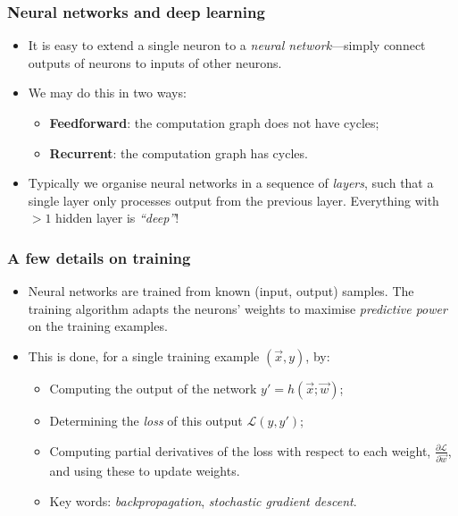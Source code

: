 \documentclass{beamer}
\begin{document}
\begin{frame}
	\frametitle{Neural networks and deep learning}
	\begin{itemize}
		\item It is easy to extend a single neuron to a \emph{neural network}---simply connect outputs of neurons to inputs of other neurons. 
		\vfill
		\item We may do this in two ways:
		\begin{itemize}
			\item \textbf{Feedforward}: the computation graph does not have cycles;
			\item \textbf{Recurrent}: the computation graph has cycles.
		\end{itemize}
		\vfill
		\item Typically we organise neural networks in a sequence of \emph{layers}, such that a single layer only processes output from the previous layer. Everything with $>1$ hidden layer is \emph{``deep''}!
	\end{itemize}
\end{frame}

\begin{frame}
	\frametitle{A few details on training}
	\begin{itemize}
		\item Neural networks are trained from known (input, output) samples. The training algorithm adapts the neurons' weights to maximise \emph{predictive power} on the training examples. 
		\vfill
		\item This is done, for a single training example $(\vec{x}, y)$, by:
		\begin{itemize} 
			\item Computing the output of the network $y' = h(\vec{x}; \vec{w})$;
			\item Determining the \emph{loss} of this output $\mathcal{L}(y, y')$;
			\item Computing partial derivatives of the loss with respect to each weight, $\frac{\partial\mathcal{L}}{\partial \vec{w}}$, and using these to update weights.
			\item Key words: \emph{backpropagation}, \emph{stochastic gradient descent}.
		\end{itemize}
	\end{itemize}
\end{frame}
\end{document}

